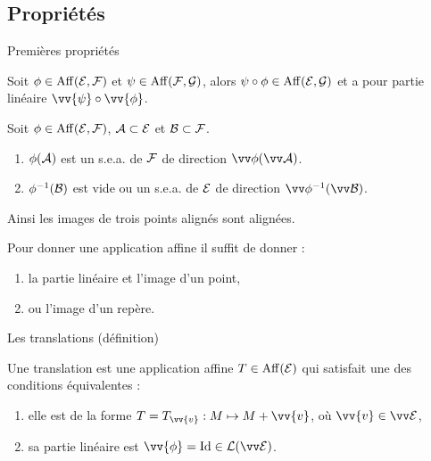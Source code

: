 \documentclass[bigger]{m53beamer}
\begin{document}
\subsection{Propriétés}
  \begin{frame}{Premières propriétés}
    \begin{proposition}
      Soit $\phi\in\operatorname{Aff}(\mathcal{E},\mathcal{F})$ et $\psi\in\operatorname{Aff}(\mathcal{F},\mathcal{G})$, alors $\psi\circ\phi\in\operatorname{Aff}(\mathcal{E},\mathcal{G})$ et a pour partie linéaire $\vv{\psi}\circ\vv{\phi}$.
    \end{proposition}\pause
    \begin{proposition}
      Soit $\phi\in\operatorname{Aff}(\mathcal{E},\mathcal{F})$, $\mathcal{A} \subset \mathcal{E}$ et $\mathcal{B} \subset \mathcal{F}$.
      \begin{enumerate}
        \item $\phi(\mathcal{A})$ est un s.e.a. de $\mathcal{F}$ de direction $\vv\phi(\ev{A})$.
        \item $\phi^{-1}(\mathcal{B})$ est vide ou un s.e.a. de $\mathcal{E}$ de direction $\vv\phi^{-1}(\ev{B})$.
      \end{enumerate}
      Ainsi les images de trois points alignés sont alignées.
    \end{proposition}\pause
    \begin{proposition}
      Pour donner une application affine il suffit de donner :
      \begin{enumerate}[<+(1)->]
        \item la partie linéaire et l'image d'un point,
        \item ou l'image d'un repère.
      \end{enumerate}
    \end{proposition}
  \end{frame}
  \begin{frame}{Les translations (définition)}
    \begin{defprop}
      Une \alert{translation} est  une application affine $T \in \operatorname{Aff}(\mathcal{E})$ qui satisfait une des conditions équivalentes :
      \begin{enumerate}[<+(1)->]
        \item elle est de la forme $T=T_{\vv{v}}:M \mapsto M+\vv{v}$, où $\vv{v} \in \ev{E}$,
        \item sa partie linéaire est $\vv{\phi}=\id \in \mathcal{L}(\ev{E})$.
      \end{enumerate}
    \end{defprop}
  \end{frame}
\end{document}
